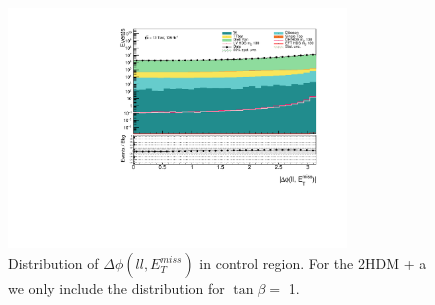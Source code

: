 \documentclass[12pt, a4paper]{book}
\begin{document}
\begin{figure}[!ht]
    \centering
        \includegraphics[width=0.8\textwidth]{dPhiLLMET.pdf}
    \caption[Distribution of $\Delta\phi(ll,E_T^{miss})$ in control region]{Distribution of $\Delta\phi(ll,E_T^{miss})$ in control region.  For the 2HDM + a we only include the distribution for $\tan\beta=$ 1.}\label{fig:dPhiLLMET_dist}
\end{figure}
\end{document}
